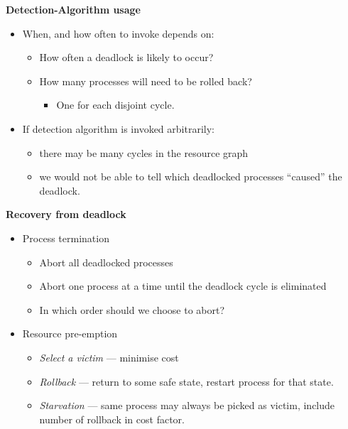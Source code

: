 \documentclass[11pt,a4paper]{article}
\begin{document}
\textbf{Detection-Algorithm usage}
\begin{itemize}
    \item When, and how often to invoke depends on:
        \begin{itemize}
            \item How often a deadlock is likely to occur?
            \item How many processes will need to be rolled back?
                \begin{itemize}
                    \item One for each disjoint cycle.
                \end{itemize}
        \end{itemize}
    \item If detection algorithm is invoked arbitrarily:
        \begin{itemize}
            \item there may be many cycles in the resource graph
            \item we would not be able to tell which deadlocked processes ``caused'' the
                deadlock.
        \end{itemize}
\end{itemize}

\textbf{Recovery from deadlock}
\begin{itemize}
    \item Process termination
        \begin{itemize}
            \item Abort all deadlocked processes
            \item Abort one process at a time until the deadlock cycle is eliminated
            \item In which order should we choose to abort?
        \end{itemize}
    \item Resource pre-emption
        \begin{itemize}
            \item \emph{Select a victim} --- minimise cost
            \item \emph{Rollback} --- return to some safe state,
                restart process for that state.
            \item \emph{Starvation} --- same process may always be picked as victim,
                include number of rollback in cost factor.
        \end{itemize}
\end{itemize}
\end{document}
